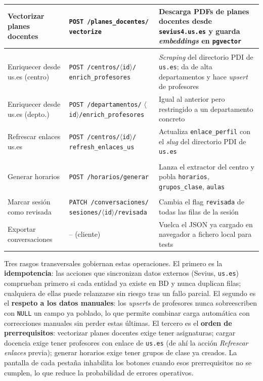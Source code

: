 \begin{table}[hbtp]
\begin{tabular}{|>{\raggedright\arraybackslash}p{3.2cm}|>{\raggedright\arraybackslash}p{4.6cm}|>{\raggedright\arraybackslash}p{4.4cm}|}
\hline
Vectorizar planes docentes & \texttt{POST /planes\_docentes/} \texttt{vectorize} & Descarga PDFs de planes docentes desde \texttt{sevius4.us.es} y guarda \textit{embeddings} en \texttt{pgvector} \\
\hline
\multicolumn{3}{|l|}{\textbf{Profesores}} \\
\hline
Enriquecer desde us.es (centro) & \texttt{POST /centros/$\langle$id$\rangle$/} \texttt{enrich\_profesores} & \textit{Scraping} del directorio PDI de \texttt{us.es}; da de alta departamentos y hace \textit{upsert} de profesores \\
\hline
Enriquecer desde us.es (depto.) & \texttt{POST /departamentos/} \texttt{$\langle$id$\rangle$/enrich\_profesores} & Igual al anterior pero restringido a un departamento concreto \\
\hline
Refrescar enlaces us.es & \texttt{POST /centros/$\langle$id$\rangle$/} \texttt{refresh\_enlaces\_us} & Actualiza \texttt{enlace\_perfil} con el \textit{slug} del directorio PDI de \texttt{us.es} \\
\hline
\multicolumn{3}{|l|}{\textbf{Horarios}} \\
\hline
Generar horarios & \texttt{POST /horarios/generar} & Lanza el extractor del centro y pobla \texttt{horarios}, \texttt{grupos\_clase}, \texttt{aulas} \\
\hline
\multicolumn{3}{|l|}{\textbf{Conversaciones}} \\
\hline
Marcar sesión como revisada & \texttt{PATCH /conversaciones/} \texttt{sesiones/$\langle$id$\rangle$/revisada} & Cambia el flag \texttt{revisada} de todas las filas de la sesión \\
\hline
Exportar conversaciones & -- (cliente) & Vuelca el JSON ya cargado en navegador a fichero local para tests \\
\hline
\end{tabular}
\end{table}

Tres rasgos transversales gobiernan estas operaciones. El primero es la \textbf{idempotencia}: las acciones que sincronizan datos externos (Sevius, \texttt{us.es}) comprueban primero si cada entidad ya existe en BD y nunca duplican filas; cualquiera de ellas puede relanzarse sin riesgo tras un fallo parcial. El segundo es el \textbf{respeto a los datos manuales}: los \textit{upserts} de profesores nunca sobreescriben con \texttt{NULL} un campo ya poblado, lo que permite combinar carga automática con correcciones manuales sin perder estas últimas. El tercero es el \textbf{orden de prerrequisitos}: vectorizar planes docentes exige tener asignaturas; cargar docencia exige tener profesores con enlace de \texttt{us.es} (de ahí la acción \textit{Refrescar enlaces} previa); generar horarios exige tener grupos de clase ya creados. La pantalla de cada pestaña inhabilita los botones cuando esos prerrequisitos no se cumplen, lo que reduce la probabilidad de errores operativos.

